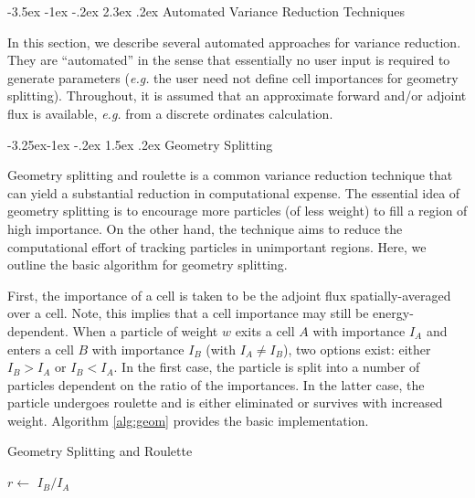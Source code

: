 \documentclass[letter,11pt]{article}
\makeatletter
\renewcommand\section{\@startsection{section}{1}{\z@}%
                                {-3.5ex \@plus -1ex \@minus -.2ex}%
                                {2.3ex \@plus.2ex}%
                                {\normalfont\large\bf}}
\renewcommand\subsection{\@startsection{subsection}{2}{\z@}%
                                {-3.25ex\@plus -1ex \@minus -.2ex}%
                                {1.5ex \@plus .2ex}%
                                {\normalfont\itshape\bf}}
\newcommand{\eg}{{\it e.g. }}
\makeatother
\begin{document}
\section{Automated Variance Reduction Techniques}
\label{sec:tech}

In this section, we describe several automated approaches for variance reduction.  They are ``automated'' in the sense that essentially no user input is required to generate parameters (\eg the user need not define cell importances for geometry splitting).  Throughout, it is assumed that an approximate forward and/or adjoint flux is available, \eg from a discrete ordinates calculation.

\subsection{Geometry Splitting}

Geometry splitting and roulette is a common variance reduction technique that can yield a substantial reduction in computational expense.  The essential idea of geometry splitting is to encourage more particles (of less weight) to fill a region of high importance.  On the other hand, the technique aims to reduce the computational effort of tracking particles in unimportant regions.  Here, we outline the basic algorithm for geometry splitting.

First, the importance of a cell is taken to be the adjoint flux spatially-averaged over a cell.  Note, this implies that a cell importance may still be energy-dependent.  When a particle of weight $w$  exits a cell $A$ with importance $I_A$ and enters a cell $B$ with importance $I_B$ (with $I_A \neq I_B$), two options exist: either $I_B > I_A$ or $I_B < I_A$.  In the first case, the particle is split into a number of particles dependent on the ratio of the importances.  In the latter case, the particle undergoes roulette and is either eliminated or survives with increased weight. Algorithm \ref{alg:geom} provides the basic implementation. 

\begin{algorithm}
 \label{alg:geom}
 \caption{Geometry Splitting and Roulette}
 $r \leftarrow$ $I_B/I_A$ \;
\end{algorithm}
\end{document}
